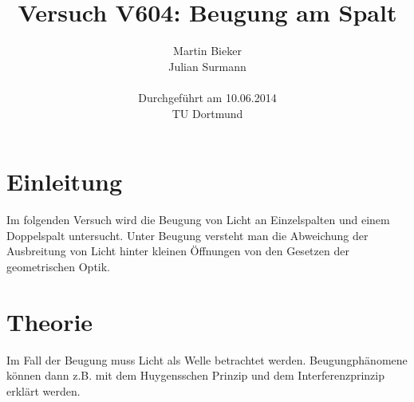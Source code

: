 \documentclass[11pt,ngerman,a4paper]{article}
\title{\textbf{Versuch V604: Beugung am Spalt}}
\author{Martin Bieker\\
		Julian Surmann\\
		\\
		Durchgef\"{u}hrt am 10.06.2014\\
		TU Dortmund}
\date{}
\begin{document}
\renewcommand\tablename{Tabelle}
\renewcommand\figurename{Abbildung}
\maketitle
\thispagestyle{empty}
\newpage
\clearpage
\setcounter{page}{1}


\section{Einleitung}
Im folgenden Versuch wird die Beugung von Licht an Einzelspalten und einem Doppelspalt untersucht. Unter Beugung versteht man die Abweichung der Ausbreitung von Licht hinter kleinen Öffnungen von den Gesetzen der geometrischen Optik.
\section{Theorie}
Im Fall der Beugung muss Licht als Welle betrachtet werden. Beugungphänomene können dann z.B. mit dem Huygensschen Prinzip und dem Interferenzprinzip erklärt werden. 
\end{document}
